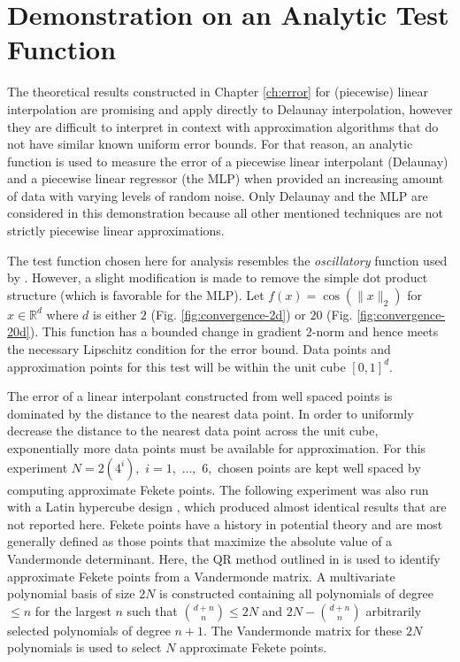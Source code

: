\vspace{-2mm}
\section{Demonstration on an Analytic Test Function}
\label{sec:analytic}

The theoretical results constructed in Chapter \ref{ch:error} for
(piecewise) linear interpolation are promising and apply directly to
Delaunay interpolation, however they are difficult to interpret in
context with approximation algorithms that do not have similar known
uniform error bounds. For that reason, an analytic function is used to
measure the error of a piecewise linear interpolant (Delaunay) and a
piecewise linear regressor (the MLP) when provided an increasing
amount of data with varying levels of random noise. Only
Delaunay and the MLP are considered in this demonstration because
all other mentioned techniques are not strictly piecewise linear
approximations.

The test function chosen here for analysis resembles the
\textit{oscillatory} function used by \cite{barthelmann2000high}.
However, a slight modification is made to remove the simple dot
product structure (which is favorable for the MLP). Let $f(x)
=\cos(\|x\|_2)$ for $x \in \mathbb{R}^d$ where $d$ is either $2$
(Fig. \ref{fig:convergence-2d}) or $20$
(Fig. \ref{fig:convergence-20d}). This function has a bounded change
in gradient $2$-norm and hence meets the necessary Lipschitz condition
for the error bound. Data points and approximation points for this
test will be within the unit cube $[0,1]^d$.

The error of a linear interpolant constructed from well spaced points
is dominated by the distance to the nearest data point. In order to
uniformly decrease the distance to the nearest data point across the
unit cube, exponentially more data points must be available for
approximation. For this experiment $N = 2(4^i),$ $i = 1,$ $\ldots,$
$6,$ chosen points are kept well spaced by computing approximate
Fekete points. The following experiment was also run with a
  Latin hypercube design \cite{park1994optimal}, which produced almost
  identical results that are not reported here. Fekete points have
a history in potential theory \cite{kovari_pommerenke_1968} and are
most generally defined as those points that maximize the absolute
value of a Vandermonde determinant. Here, the QR method outlined in
\cite{bos2010computing} is used to identify approximate Fekete points
from a Vandermonde matrix. A multivariate polynomial basis of size
$2N$ is constructed containing all polynomials of degree $\leq n$ for
the largest $n$ such that ${d+n \choose n} \leq 2N$ and $2N - {d+n
  \choose n}$ arbitrarily selected polynomials of degree $n + 1.$ The
Vandermonde matrix for these $2N$ polynomials is used to select $N$
approximate Fekete points.

